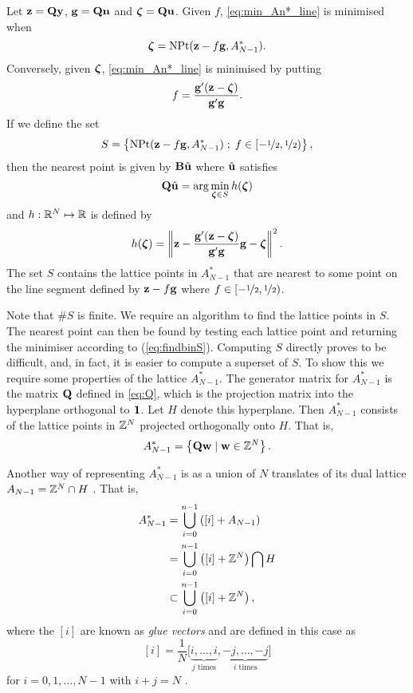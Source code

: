 Let $\mathbf{z} = \mathbf{Q}\mathbf{y}$, $\mathbf{g} = \mathbf{Q}\mathbf{n}$ and $\boldsymbol{\zeta} = \mathbf{Q}\mathbf{u}$.  Given $f$,
\eqref{eq:min_An*_line} is minimised when
\[
\boldsymbol{\zeta} = \operatorname{NPt}(\mathbf{z} - f\mathbf{g}, A_{N-1}^*).
\]
Conversely, given $\boldsymbol{\zeta}$, \eqref{eq:min_An*_line} is minimised by putting
\[
f = \frac{\mathbf{g}'(\mathbf{z} - \boldsymbol{\zeta})}{\mathbf{g}'\mathbf{g}}.
\]
If we define the set
\begin{equation}\label{eq:setS}
  S = \left\{ \NP(\zbf - f\gbf, A_{N-1}^*) \; ; \; f\in[-\nicefrac{1}{2},\nicefrac{1}{2}) \right\},
\end{equation}
then the nearest point is given by $\mathbf{B}\hat{\mathbf{u}}$ where $\hat{\mathbf{u}}$ satisfies
\begin{equation} \label{eq:findbinS}
\Qbf\hat{\ubf} = \arg\min_{\zetabf \in S} h(\zetabf)
\end{equation}
and $h: {\mathbb R}^N \mapsto {\mathbb R}$ is defined by
\[
h(\boldsymbol{\zeta}) = \left\|\mathbf{z} - \frac{\mathbf{g}'(\mathbf{z} - \boldsymbol{\zeta})}{\mathbf{g}'\mathbf{g}}\mathbf{g} - \boldsymbol{\zeta} \right\|^2.
\]
The set $S$ contains the lattice points in $A_{N-1}^*$ that are nearest to
some point on the line segment defined by $\mathbf{z} - f\mathbf{g}$ where
$f\in[-\nicefrac{1}{2},\nicefrac{1}{2})$.

Note that $\#S$ is finite.  We require an algorithm to find the lattice points
in $S$.  The nearest point can then be found by testing each lattice point and
returning the minimiser according to (\ref{eq:findbinS}). Computing $S$
directly proves to be difficult, and, in fact, it is easier to compute a
superset of $S$.  To show this we require some properties of the lattice
$A_{N-1}^*$.  The generator matrix for $A_{N-1}^*$ is the matrix $\mathbf{Q}$
defined in \eqref{eq:Q}, which is the projection matrix into the hyperplane
orthogonal to $\boldsymbol{1}$.  Let $H$ denote this hyperplane.  Then $A_{N-1}^*$
consists of the lattice points in ${\mathbb Z}^N$ projected orthogonally onto $H$.
That is,
\[
A_{N-1}^* = \left\{ \mathbf{Q}\mathbf{w} \mid \mathbf{w} \in {\mathbb Z}^N \right\}.
\]

Another way of representing $A_{N-1}^*$ is as a union of $N$ translates of its dual lattice $A_{N-1} = {\mathbb Z}^{N} \cap H$ \cite{SPLAG}.  That is,
\begin{align}
  A_{N-1}^* &= \bigcup_{i=0}^{n-1} \left( [i] + A_{N-1} \right) \nonumber \\
  					&= \bigcup_{i=0}^{n-1} \left( [i] + \ints^N \right) \bigcap H \\
            &\subset \bigcup_{i=0}^{n-1} \left( [i] + \ints^N \right),\label{eq:An*asglues}
\end{align}
where the $[i]$ are known as \emph{glue vectors} and are defined in
this case as
\begin{equation} \label{eq:Anglues}
  [i] = \frac{1}{N} \big[ \underbrace{i, \dots, i}_{\text{$j$ times}},
        \underbrace{-j, \dots, -j}_{\text{$i$ times}}
  \big]
\end{equation}
for $i = 0,1, \dots, N-1$ with $i+j = N$ \cite[pp. 109]{SPLAG}.

